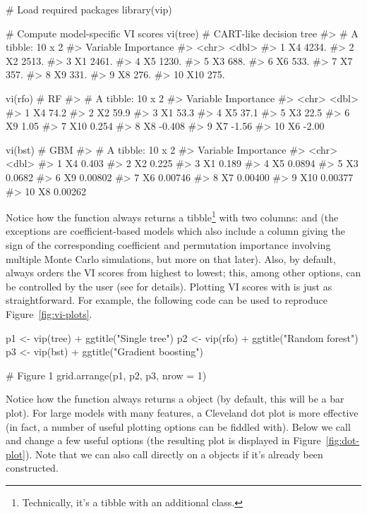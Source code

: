 \begin{example}
# Load required packages
library(vip)

# Compute model-specific VI scores
vi(tree)  # CART-like decision tree
#> # A tibble: 10 x 2
#>    Variable Importance
#>    <chr>         <dbl>
#>  1 X4            4234.
#>  2 X2            2513.
#>  3 X1            2461.
#>  4 X5            1230.
#>  5 X3             688.
#>  6 X6             533.
#>  7 X7             357.
#>  8 X9             331.
#>  9 X8             276.
#> 10 X10            275.

vi(rfo)   # RF
#> # A tibble: 10 x 2
#>    Variable Importance
#>    <chr>         <dbl>
#>  1 X4           74.2  
#>  2 X2           59.9  
#>  3 X1           53.3  
#>  4 X5           37.1  
#>  5 X3           22.5  
#>  6 X9            1.05 
#>  7 X10           0.254
#>  8 X8           -0.408
#>  9 X7           -1.56 
#> 10 X6           -2.00

vi(bst)   # GBM
#> # A tibble: 10 x 2
#>    Variable Importance
#>    <chr>         <dbl>
#>  1 X4          0.403  
#>  2 X2          0.225  
#>  3 X1          0.189  
#>  4 X5          0.0894 
#>  5 X3          0.0682 
#>  6 X9          0.00802
#>  7 X6          0.00746
#>  8 X7          0.00400
#>  9 X10         0.00377
#> 10 X8          0.00262
\end{example}

Notice how the  function always returns a tibble\footnote{Technically, it's a tibble with an additional  class.} with two columns:  and  (the exceptions are coefficient-based models which also include a  column giving the sign of the corresponding coefficient and permutation importance involving multiple Monte Carlo simulations, but more on that later). Also, by default,  always orders the VI scores from highest to lowest; this, among other options, can be controlled by the user (see  for details). Plotting VI scores with  is just as straightforward. For example, the following code can be used to reproduce Figure~\ref{fig:vi-plots}.

\begin{example}
p1 <- vip(tree) + ggtitle("Single tree")
p2 <- vip(rfo) + ggtitle("Random forest")
p3 <- vip(bst) + ggtitle("Gradient boosting")

# Figure 1
grid.arrange(p1, p2, p3, nrow = 1)
\end{example}

Notice how the  function always returns a  object (by default, this will be a bar plot). For large models with many features, a Cleveland dot plot is more effective (in fact, a number of useful plotting options can be fiddled with). Below we call  and change a few useful options (the resulting plot is displayed in Figure~\ref{fig:dot-plot}). Note that we can also call  directly on a  objects if it's already been constructed.

